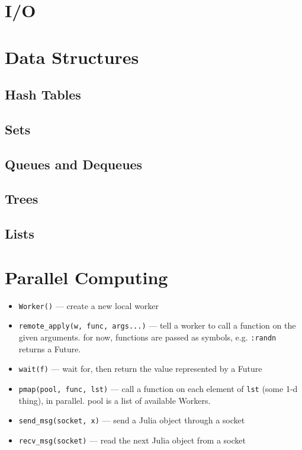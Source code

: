 \documentclass{article}
\begin{document}
\section{I/O}
\section{Data Structures}
\subsection{Hash Tables}
\subsection{Sets}
\subsection{Queues and Dequeues}
\subsection{Trees}
\subsection{Lists}

\section{Parallel Computing}
\begin{itemize}
  \item \verb|Worker()| ---
     create a new local worker

  \item \verb|remote_apply(w, func, args...)| ---
     tell a worker to call a function on the given arguments.
     for now, functions are passed as symbols, e.g. \verb|:randn|
     returns a Future.

   \item \verb|wait(f)| ---
     wait for, then return the value represented by a Future

   \item \verb|pmap(pool, func, lst)| ---
     call a function on each element of \verb|lst| (some 1-d thing), in
     parallel. pool is a list of available Workers.

   \item \verb|send_msg(socket, x)| ---
     send a Julia object through a socket

   \item \verb|recv_msg(socket)| ---
     read the next Julia object from a socket
\end{itemize}
\end{document}
